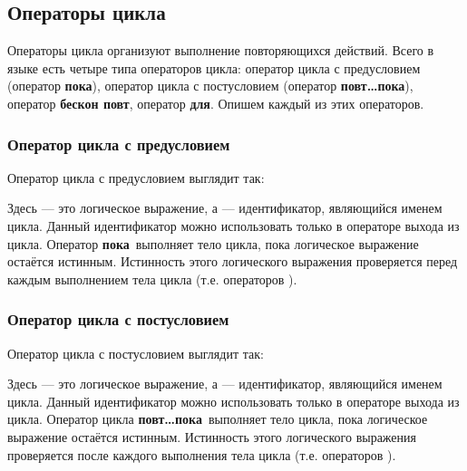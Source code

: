 \documentclass[10pt]{report}
\begin{document}
    \subsection{Операторы цикла}
Операторы цикла организуют выполнение повторяющихся действий. Всего в языке есть четыре типа операторов цикла: оператор цикла с предусловием (оператор \textbf{\glqq пока\grqq}),
оператор цикла с постусловием (оператор \textbf{\glqq повт\dots пока\grqq}), оператор \textbf{\glqq бескон повт\grqq}, оператор \textbf{\glqq для\grqq}. Опишем каждый из этих операторов.
        \subsubsection{Оператор цикла с предусловием}
Оператор цикла с предусловием выглядит так:
\begin{center}
\textcolor{Green}{}
\end{center}
Здесь \textcolor{Green}{} --- это логическое выражение, а  \textcolor{Green}{} --- идентификатор, являющийся именем цикла.
Данный идентификатор можно использовать только в операторе выхода из цикла. Оператор \textbf{\glqq пока\grqq}\ выполняет тело цикла, пока логическое выражение
\textcolor{Green}{} остаётся истинным. Истинность этого логического выражения проверяется перед каждым выполнением тела цикла (т.е.
операторов \textcolor{Green}{}).
        \subsubsection{Оператор цикла с постусловием}
Оператор цикла с постусловием выглядит так:
\begin{center}
\textcolor{Green}{}
\end{center}
Здесь \textcolor{Green}{} --- это логическое выражение, а  \textcolor{Green}{} --- идентификатор, являющийся именем цикла.
Данный идентификатор можно использовать только в операторе выхода из цикла. Оператор цикла \textbf{\glqq повт\dots пока\grqq}\ выполняет тело цикла, пока логическое
выражение \textcolor{Green}{} остаётся истинным. Истинность этого логического выражения проверяется после каждого выполнения тела цикла (т.е.
операторов \textcolor{Green}{}).
\end{document}
